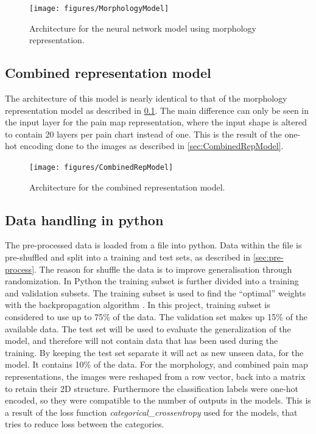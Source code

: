 \begin{figure} [H]
\centering
\texttt{[image: figures/MorphologyModel]}
\caption{Architecture for the neural network model using morphology representation.}
\label{fig:MorphologyModel} 
\end{figure}

\subsection{Combined representation model}\label{sec:CombinedRepModel}
The architecture of this model is nearly identical to that of the morphology representation model as described in \ref{sec:CombinedRepModel}.
The main difference can only be seen in the input layer for the pain map representation, where the input shape is altered to contain 20 layers per pain chart instead of one. This is the result of the one-hot encoding done to the images as described in \autoref{sec:CombinedRepModel}. 

\begin{figure} [H]
\centering
\texttt{[image: figures/CombinedRepModel]}
\caption{Architecture for the combined representation model.}
\label{fig:CombinedRepModel} 
\end{figure}

\subsection{Data handling in python}
The pre-processed data is loaded from a  file into python.
Data within the file is pre-shuffled and split into a training and test sets, as described in \autoref{sec:pre-process}. The reason for shuffle the data is to improve generalisation through randomization.
In Python the training subset is further divided into a training and validation subsets. 
The training subset is used to find the “optimal” weights with the backpropagation algorithm \citep{Bengio2012}. In this project, training subset is considered to use up to 75\% of the data. The validation set makes up 15\% of the available data.
The test set will be used to evaluate the generalization of the model, and therefore will not contain data that has been used during the training. By keeping the test set separate it will act as new unseen data, for the model. It contains 10\% of the data.
For the morphology, and combined pain map representations, the images were reshaped from a row vector, back into a matrix to retain their 2D structure.
Furthermore the classification labels were one-hot encoded, so they were compatible to the number of outputs in the models. This is a result of the loss function \textit{categorical_crossentropy} used for the models, that tries to reduce loss between the categories.    


